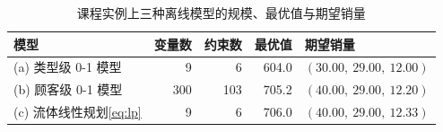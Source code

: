 \begin{table}[htbp]
\centering\small
\caption{课程实例上三种离线模型的规模、最优值与期望销量}\label{tab:offline}
\begin{tabular}{lrrrl}
\toprule
模型 & 变量数 & 约束数 & 最优值 & 期望销量 \\
\midrule
(a) 类型级 0-1 模型 & 9 & 6 & 604.0 & $(30.00,\ 29.00,\ 12.00)$ \\
(b) 顾客级 0-1 模型 & 300 & 103 & 705.2 & $(40.00,\ 29.00,\ 12.20)$ \\
(c) 流体线性规划\eqref{eq:lp} & 9 & 6 & 706.0 & $(40.00,\ 29.00,\ 12.33)$ \\
\bottomrule
\end{tabular}
\par\vspace{0.35em}{\footnotesize 顾客级模型在五份数据上的最优值与期望销量都相同，变量数与约束数按 $T=100$ 计算；流体线性规划的约束数不含变量上界。}
\end{table}
